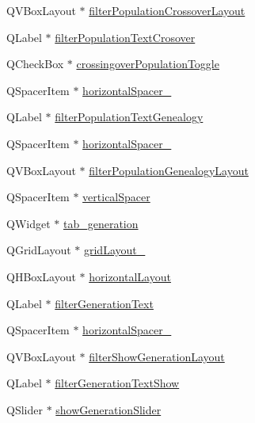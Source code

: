 \begin{DoxyCompactItemize}
\item 
Q\+V\+Box\+Layout $\ast$ \hyperlink{class_ui___g_a___viz_a13af0f5ecdd13742fe0d2f2b96656cba}{filter\+Population\+Crossover\+Layout}
\item 
Q\+Label $\ast$ \hyperlink{class_ui___g_a___viz_a25842c389ceb4c3d496533031fbf2f15}{filter\+Population\+Text\+Crosover}
\item 
Q\+Check\+Box $\ast$ \hyperlink{class_ui___g_a___viz_a03d4b8dee5ceb0f9bc0a3157d511adea}{crossingover\+Population\+Toggle}
\item 
Q\+Spacer\+Item $\ast$ \hyperlink{class_ui___g_a___viz_aa8ba6cd3f77c50bc4a751332f6cda340}{horizontal\+Spacer\+\_}
\item 
Q\+Label $\ast$ \hyperlink{class_ui___g_a___viz_a4d18e2b03705b7ad9815959c0e70377c}{filter\+Population\+Text\+Genealogy}
\item 
Q\+Spacer\+Item $\ast$ \hyperlink{class_ui___g_a___viz_a15cc127d197dbdc5ba275a27e4a713cf}{horizontal\+Spacer\+\_}
\item 
Q\+V\+Box\+Layout $\ast$ \hyperlink{class_ui___g_a___viz_a77021ea7e8e0bf72a422257e829b50ba}{filter\+Population\+Genealogy\+Layout}
\item 
Q\+Spacer\+Item $\ast$ \hyperlink{class_ui___g_a___viz_ac5fc1a1d98c5614966b52a02f948ad65}{vertical\+Spacer}
\item 
Q\+Widget $\ast$ \hyperlink{class_ui___g_a___viz_adbba94b51ea02ce6e82bb64115130310}{tab\+\_\+generation}
\item 
Q\+Grid\+Layout $\ast$ \hyperlink{class_ui___g_a___viz_aed5d2ac5a7f7bf29a6c1e145a7b36412}{grid\+Layout\+\_}
\item 
Q\+H\+Box\+Layout $\ast$ \hyperlink{class_ui___g_a___viz_aff191189ef3eecf222f6d74b69c2bcbc}{horizontal\+Layout}
\item 
Q\+Label $\ast$ \hyperlink{class_ui___g_a___viz_ad1f6bc732cbba3cd2ec77116ebfc3c7c}{filter\+Generation\+Text}
\item 
Q\+Spacer\+Item $\ast$ \hyperlink{class_ui___g_a___viz_a5e5a5960815024c7be78c8b9d8e9a255}{horizontal\+Spacer\+\_}
\item 
Q\+V\+Box\+Layout $\ast$ \hyperlink{class_ui___g_a___viz_a1e024753d2cf95c92c55113cfa06606b}{filter\+Show\+Generation\+Layout}
\item 
Q\+Label $\ast$ \hyperlink{class_ui___g_a___viz_a25d2b975d22df9cc8b2ae5601a628837}{filter\+Generation\+Text\+Show}
\item 
Q\+Slider $\ast$ \hyperlink{class_ui___g_a___viz_a66126f49b6ce12ed7319e7ca076d0203}{show\+Generation\+Slider}

\end{DoxyCompactItemize}
